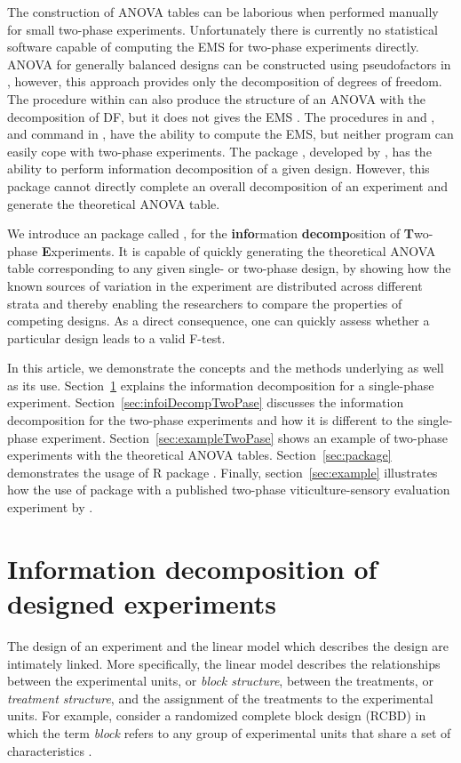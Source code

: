 \documentclass[article]{jss}
\begin{document}
The construction of ANOVA tables can be laborious when performed manually for small two-phase experiments. Unfortunately there is currently no statistical software capable of computing the EMS for two-phase experiments directly. ANOVA for generally balanced designs can be constructed using pseudofactors in , however, this approach provides only the decomposition of degrees of freedom. The  procedure within  can also produce the structure of an ANOVA with the decomposition of DF, but it does not gives the EMS \citep{Brien2006a}. The  procedures in  and , and  command in , have the ability to compute the EMS, but neither program can easily cope with two-phase experiments. The  package , developed by \cite{Brien2011a}, has the ability to perform information decomposition of a given design. However, this package cannot directly complete an overall decomposition of an experiment and generate the theoretical ANOVA table.

We introduce an  package called , for the {\bf info}rmation {\bf decomp}osition of {\bf T}wo-phase {\bf E}xperiments. It is capable of quickly generating the theoretical ANOVA table corresponding to any given single- or two-phase design, by showing how the known sources of variation in the experiment are distributed across different strata and thereby enabling the researchers to compare the properties of competing designs. As a direct consequence, one can quickly assess whether a particular design leads to a valid F-test.

In this article, we demonstrate the concepts and the methods underlying  as well as its use. Section~\ref{sec:infoDecomp} explains the information decomposition for a single-phase experiment. Section~\ref{sec:infoiDecompTwoPase} discusses the information decomposition for the two-phase experiments and how it is different to the single-phase experiment. Section~\ref{sec:exampleTwoPase} shows an example of two-phase experiments with the theoretical ANOVA tables. Section~\ref{sec:package} demonstrates the usage of R package . Finally, section~\ref{sec:example} illustrates how the use of package with a published two-phase viticulture-sensory evaluation experiment by \cite{Brien1999}.

\section{Information decomposition of designed experiments} 
\label{sec:infoDecomp}
The design of an experiment and the linear model which describes the design are intimately linked. More specifically, the linear model describes the relationships between the experimental units, or \emph{block structure}, between the treatments, or \emph{treatment structure}, and the assignment of the treatments to the experimental units. For example, consider a randomized complete block design (RCBD) in which the term \emph{block} refers to any group of experimental units that share a set of characteristics \citep{Bailey2008}.
 
\end{document}
